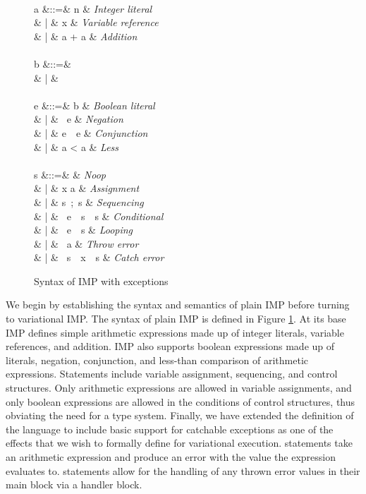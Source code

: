 \documentclass[12pt,oneside]{book}
\begin{document}
\begin{figure}
\begin{syntax}
\\
a &::=& n & \textit{Integer literal} \\
& | & x & \textit{Variable reference} \\
& | & a + a & \textit{Addition} \\
 \\
b &::=&  \\
& | &  \\
 \\
e &::=& b & \textit{Boolean literal} \\
& | & \ e & \textit{Negation} \\
& | & e\ \ e & \textit{Conjunction} \\
& | & a < a & \textit{Less} \\
 \\
s &::=&  & \textit{Noop} \\
& | & x \coloneqq a & \textit{Assignment} \\
& | & s\ ;\ s & \textit{Sequencing} \\
& | & \ e\ \ s\ \ s & \textit{Conditional} \\
& | & \ e\ \ s & \textit{Looping} \\
& | & \ a & \textit{Throw error} \\
& | & \ s\ \ x\ \ s & \textit{Catch error}
\end{syntax}
\caption{Syntax of IMP with exceptions}
\label{fig:impsyn}
\end{figure}

We begin by establishing the syntax and semantics of plain IMP before turning to variational IMP. The syntax of plain IMP is defined in Figure \ref{fig:impsyn}.
At its base IMP defines simple arithmetic expressions made up of integer literals, variable references, and addition. IMP also supports boolean expressions
made up of literals, negation, conjunction, and less-than comparison of arithmetic expressions. Statements include variable assignment, sequencing, and
control structures. Only arithmetic expressions are allowed in variable assignments, and only boolean expressions are allowed in the conditions of control
structures, thus obviating the need for a type system. Finally, we have extended the definition of the language to include basic support for catchable exceptions
as one of the effects that we wish to formally define for variational execution.  statements take an arithmetic expression and produce an
error with the value the expression evaluates to.  statements allow for the handling of any thrown error values in their main block via a
handler block.
\end{document}
